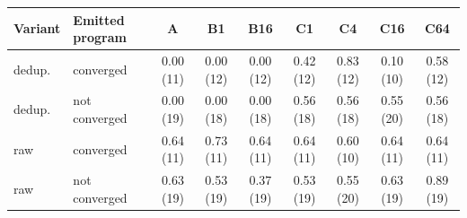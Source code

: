 \begin{tabular}{llccccccc}\toprule
Variant & Emitted program & A & B1 & B16 & C1 & C4 & C16 & C64\\\midrule
dedup. & converged & 0.00 (11) & 0.00 (12) & 0.00 (12) & 0.42 (12) & 0.83 (12) & 0.10 (10) & 0.58 (12)\\
dedup. & not converged & 0.00 (19) & 0.00 (18) & 0.00 (18) & 0.56 (18) & 0.56 (18) & 0.55 (20) & 0.56 (18)\\
raw & converged & 0.64 (11) & 0.73 (11) & 0.64 (11) & 0.64 (11) & 0.60 (10) & 0.64 (11) & 0.64 (11)\\
raw & not converged & 0.63 (19) & 0.53 (19) & 0.37 (19) & 0.53 (19) & 0.55 (20) & 0.63 (19) & 0.89 (19)\\
\bottomrule\end{tabular}
